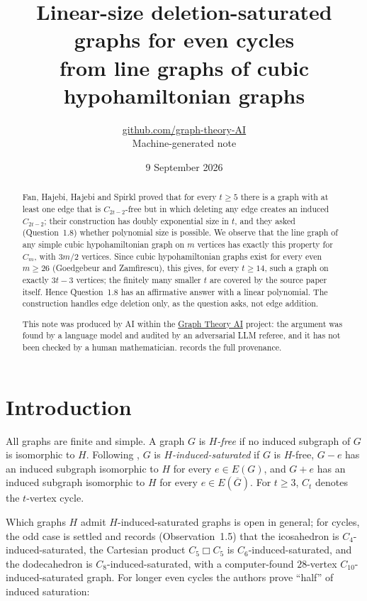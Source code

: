 \documentclass[11pt,a4paper]{article}
\title{Linear-size deletion-saturated graphs for even cycles\\ from line graphs of cubic hypohamiltonian graphs}
\author{\href{https://github.com/graph-theory-AI}{github.com/graph-theory-AI}\\[2pt] \normalsize Machine-generated note}
\date{9 September 2026}
\theoremstyle{plain}
\theoremstyle{definition}
\theoremstyle{remark}
\newcommand{\cart}{\mathbin{\mdlgwhtsquare}}
\begin{document}
\maketitle


\begin{abstract}
Fan, Hajebi, Hajebi and Spirkl proved that for every $t\ge5$ there is a graph with at least one edge that is $C_{2t-2}$-free but in which deleting any edge creates an induced $C_{2t-2}$; their construction has doubly exponential size in $t$, and they asked (Question~1.8) whether polynomial size is possible. We observe that the line graph of any simple cubic hypohamiltonian graph on $m$ vertices has exactly this property for $C_m$, with $3m/2$ vertices. Since cubic hypohamiltonian graphs exist for every even $m\ge26$ (Goedgebeur and Zamfirescu), this gives, for every $t\ge14$, such a graph on exactly $3t-3$ vertices; the finitely many smaller $t$ are covered by the source paper itself. Hence Question~1.8 has an affirmative answer with a linear polynomial. The construction handles edge deletion only, as the question asks, not edge addition.

\medskip\noindent\small
This note was produced by AI within the \href{https://github.com/graph-theory-AI/Graph-Theory-LLM-Proofs}{Graph Theory AI} project:
the argument was found by a language model and audited by an adversarial LLM
referee, and it has not been checked by a human mathematician.
 records the full provenance.

\end{abstract}

\section{Introduction}\label{sec:intro}

All graphs are finite and simple. A graph $G$ is \emph{$H$-free} if no induced subgraph of $G$ is isomorphic to $H$. Following \cite{FHHS25}, $G$ is \emph{$H$-induced-saturated} if $G$ is $H$-free, $G-e$ has an induced subgraph isomorphic to $H$ for every $e\in E(G)$, and $G+e$ has an induced subgraph isomorphic to $H$ for every $e\in E(\overline G)$. For $t\ge3$, $C_t$ denotes the $t$-vertex cycle.

Which graphs $H$ admit $H$-induced-saturated graphs is open in general; for cycles, the odd case is settled and \cite{FHHS25} records (Observation~1.5) that the icosahedron is $C_4$-induced-saturated, the Cartesian product $C_5\cart C_5$ is $C_6$-induced-saturated, and the dodecahedron is $C_8$-induced-saturated, with a computer-found $28$-vertex $C_{10}$-induced-saturated graph. For longer even cycles the authors prove ``half'' of induced saturation:
\end{document}
